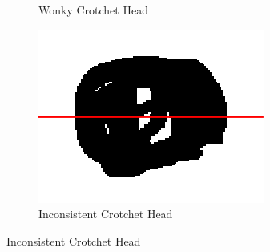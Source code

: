 \begin{figure}[H]
\begin{subfigure}[b]{.32\linewidth}
        \caption{Wonky Crotchet Head}
    \end{subfigure}
    \begin{subfigure}[b]{.32\linewidth}
        \centering
        \includegraphics[width=\linewidth]{gfx/techniques/scoring/note-head/6192-centroid-centre.png}
        \caption{Inconsistent Crotchet Head}
    \end{subfigure}
    

\end{figure}
